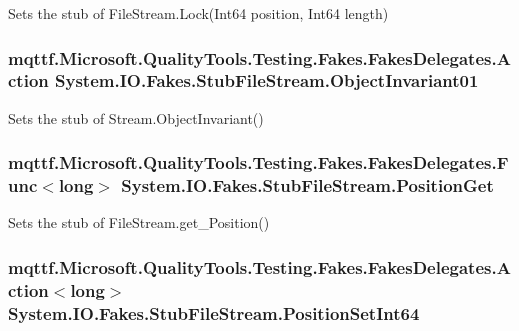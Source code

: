 Sets the stub of File\-Stream.\-Lock(\-Int64 position, Int64 length)

\hypertarget{class_system_1_1_i_o_1_1_fakes_1_1_stub_file_stream_a0f847be5ace85ee55d2a540469d18541}{
\subsubsection[{Object\-Invariant01}]{\setlength{\rightskip}{0pt plus 5cm}mqttf.\-Microsoft.\-Quality\-Tools.\-Testing.\-Fakes.\-Fakes\-Delegates.\-Action System.\-I\-O.\-Fakes.\-Stub\-File\-Stream.\-Object\-Invariant01}}\label{class_system_1_1_i_o_1_1_fakes_1_1_stub_file_stream_a0f847be5ace85ee55d2a540469d18541}


Sets the stub of Stream.\-Object\-Invariant()

\hypertarget{class_system_1_1_i_o_1_1_fakes_1_1_stub_file_stream_af6212a0d1593fcb04a30a6ef3820fa34}{
\subsubsection[{Position\-Get}]{\setlength{\rightskip}{0pt plus 5cm}mqttf.\-Microsoft.\-Quality\-Tools.\-Testing.\-Fakes.\-Fakes\-Delegates.\-Func$<$long$>$ System.\-I\-O.\-Fakes.\-Stub\-File\-Stream.\-Position\-Get}}\label{class_system_1_1_i_o_1_1_fakes_1_1_stub_file_stream_af6212a0d1593fcb04a30a6ef3820fa34}


Sets the stub of File\-Stream.\-get\-\_\-\-Position()

\hypertarget{class_system_1_1_i_o_1_1_fakes_1_1_stub_file_stream_aa61d15d19a0de6ec36381d03870d819c}{
\subsubsection[{Position\-Set\-Int64}]{\setlength{\rightskip}{0pt plus 5cm}mqttf.\-Microsoft.\-Quality\-Tools.\-Testing.\-Fakes.\-Fakes\-Delegates.\-Action$<$long$>$ System.\-I\-O.\-Fakes.\-Stub\-File\-Stream.\-Position\-Set\-Int64}}\label{class_system_1_1_i_o_1_1_fakes_1_1_stub_file_stream_aa61d15d19a0de6ec36381d03870d819c}



